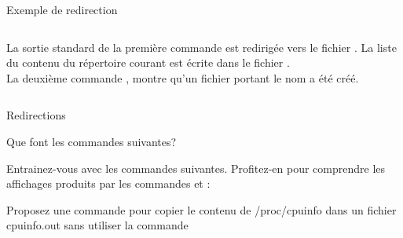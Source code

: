 \begin{frame}{Exemple de redirection}
\begin{columns}
\begin{column}{5.5cm}
\begin{center}
      \end{center}
      \scriptsize{  }
      La sortie standard de la première commande  est redirigée vers le fichier . La liste du contenu du répertoire courant est écrite dans le fichier .\\
      La deuxième commande , montre qu'un fichier portant le nom
       a été créé.\\\vspace{2pt}
    \end{column}
  \end{columns}
\end{frame}




\begin{exercice}
  \begin{exercicelet}{Redirections}
    \begin{questions}
    \item Que font les commandes suivantes?
      \small{ }
    \item Entrainez-vous avec les commandes suivantes. Profitez-en pour
      comprendre les affichages produits par les commandes  et
      :
      \begin{center}
      \end{center}
    \item Proposez une commande pour copier le contenu de /proc/cpuinfo
      dans un fichier cpuinfo.out sans utiliser la commande 
    \end{questions}
  \end{exercicelet}
\end{exercice}

